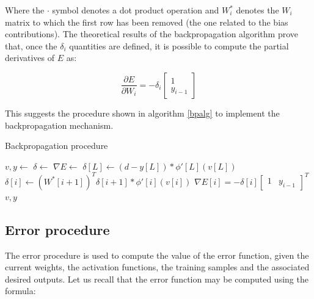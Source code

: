 \documentclass[letterpaper,headings=standardclasses]{scrartcl}
\begin{document}
Where the $\cdot$ symbol denotes a dot product operation and $W^*_i$ denotes the $W_i$ matrix to which the first row has been removed (the one related to the bias contributions). The theoretical results of the backpropagation algorithm prove that, once the $\delta_i$ quantities are defined, it is possible to compute the partial derivatives of $E$ as:

$$ \frac{\partial E}{\partial W_i} = - \delta_i \left[ \begin{matrix} 1 \\ y_{i - 1} \end{matrix} \right] $$

This suggests the procedure shown in algorithm \ref{bpalg} to implement the backpropagation mechanism.

\begin{algorithm}[h]
    \caption{Backpropagation procedure}
    \label{bpalg}
    \begin{algorithmic}
    
        \State {}
        \State $v, y \gets $ 
        \State $\delta \gets $ 
        \State $\nabla E \gets $ 
        \State {}
        \State $\delta[L] \gets (d - y[L]) * \phi'[L](v[L])$
            \State $\delta[i] \gets \left( W^*[i + 1] \right)^T \delta[i + 1] * \phi'[i](v[i])$
        \EndFor
        \State {}
            \State $\nabla E[i] = -\delta[i] \left[ \begin{matrix} 1 & y_{i - 1} \end{matrix} \right]^T$
        \EndFor
        \State \Return $v, y$
    \EndFunction
    
    \end{algorithmic}
\end{algorithm}

\subsection{Error procedure}

The error procedure is used to compute the value of the error function, given the current weights, the activation functions, the training samples and the associated desired outputs. Let us recall that the error function may be computed using the formula:
\end{document}
